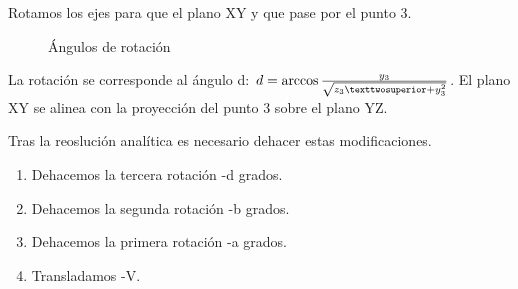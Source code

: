 Rotamos los ejes para que el plano XY y que pase por el punto 3.

\begin{figure}[h!]
	\begin{center}
     	\end{center}
    	\caption{Ángulos de rotación}\label{fig:triang5}
\end{figure}

La rotación se corresponde al ángulo d: $d = \arccos {y_3 \over {\sqrt{z_3²+y_3^2}}}$. El plano XY se alinea con la proyección del punto 3 sobre el plano YZ. 

Tras la reoslución analítica es necesario dehacer estas modificaciones. 

\begin{enumerate}
\item Dehacemos la tercera rotación -d grados.
\item Dehacemos la segunda rotación -b grados.
\item Dehacemos la primera rotación -a grados.
\item Transladamos -V.
\end{enumerate}


